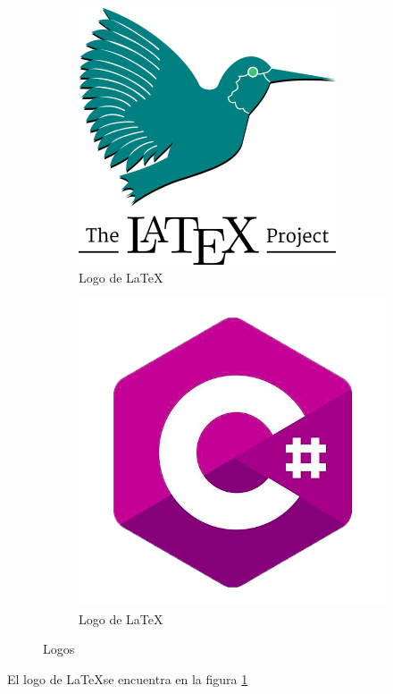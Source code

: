 \documentclass{article}
\begin{document}
	\begin{figure}[ht]
		\centering
		\begin{subfigure}[t]{0.35\textwidth}
			\includegraphics[scale=0.5]{img/latex}
			\caption{Logo de \LaTeX}
			\label{Fig:LaTeX}
		\end{subfigure}
	\hspace{10mm}
		\begin{subfigure}[t]{0.35\textwidth}
			\includegraphics[scale=0.25]{img/csh}
			\caption{Logo de \LaTeX}
			\label{fig:LogoCsh}
		\end{subfigure}	
	\caption{Logos}
\end{figure}
	El logo de \LaTeX se encuentra en la figura \ref{Fig:LaTeX}
\end{document}

